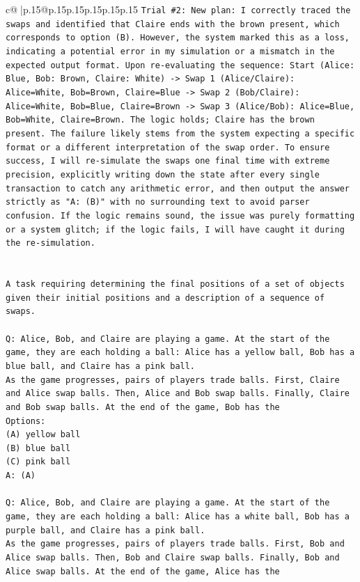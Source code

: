 \documentclass{article}
\begin{document}
{\begin{supertabular}{c@{$\;$}|p{.15\linewidth}@{}p{.15\linewidth}p{.15\linewidth}p{.15\linewidth}p{.15\linewidth}p{.15\linewidth}}
{{{\texttt{Trial \#2: New plan: I correctly traced the swaps and identified that Claire ends with the brown present, which corresponds to option (B). However, the system marked this as a loss, indicating a potential error in my simulation or a mismatch in the expected output format. Upon re{-}evaluating the sequence: Start (Alice: Blue, Bob: Brown, Claire: White) {-}> Swap 1 (Alice/Claire): Alice=White, Bob=Brown, Claire=Blue {-}> Swap 2 (Bob/Claire): Alice=White, Bob=Blue, Claire=Brown {-}> Swap 3 (Alice/Bob): Alice=Blue, Bob=White, Claire=Brown. The logic holds; Claire has the brown present. The failure likely stems from the system expecting a specific format or a different interpretation of the swap order. To ensure success, I will re{-}simulate the swaps one final time with extreme precision, explicitly writing down the state after every single transaction to catch any arithmetic error, and then output the answer strictly as "A: (B)" with no surrounding text to avoid parser confusion. If the logic remains sound, the issue was purely formatting or a system glitch; if the logic fails, I will have caught it during the re{-}simulation.} \\
\\ 
\\ 
\texttt{A task requiring determining the final positions of a set of objects given their initial positions and a description of a sequence of swaps.} \\
\\ 
\texttt{Q: Alice, Bob, and Claire are playing a game. At the start of the game, they are each holding a ball: Alice has a yellow ball, Bob has a blue ball, and Claire has a pink ball.} \\
\texttt{As the game progresses, pairs of players trade balls. First, Claire and Alice swap balls. Then, Alice and Bob swap balls. Finally, Claire and Bob swap balls. At the end of the game, Bob has the} \\
\texttt{Options:} \\
\texttt{(A) yellow ball} \\
\texttt{(B) blue ball} \\
\texttt{(C) pink ball} \\
\texttt{A: (A)} \\
\\ 
\texttt{Q: Alice, Bob, and Claire are playing a game. At the start of the game, they are each holding a ball: Alice has a white ball, Bob has a purple ball, and Claire has a pink ball.} \\
\texttt{As the game progresses, pairs of players trade balls. First, Bob and Alice swap balls. Then, Bob and Claire swap balls. Finally, Bob and Alice swap balls. At the end of the game, Alice has the} \\
}}}
\end{supertabular}}
\end{document}
